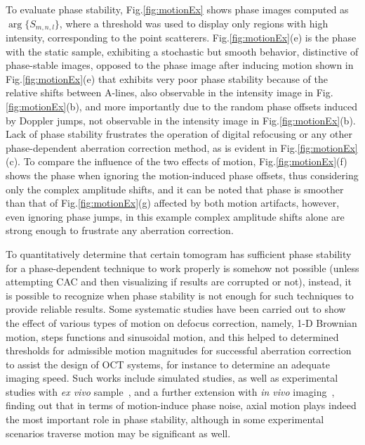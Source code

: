 To evaluate phase stability, Fig.\ref{fig:motionEx} shows phase images computed as $\arg\{S_{m,n,l}\}$, where a threshold was used to display only regions with high intensity, corresponding to the point scatterers. Fig.\ref{fig:motionEx}(e) is the phase with the static sample, exhibiting a stochastic but smooth behavior, distinctive of phase-stable images, opposed to the phase image after inducing motion shown in Fig.\ref{fig:motionEx}(e) that exhibits very poor phase stability because of the relative shifts between A-lines, also observable in the intensity image in Fig.\ref{fig:motionEx}(b), and more importantly due to the random phase offsets induced by Doppler jumps, not observable in the intensity image in Fig.\ref{fig:motionEx}(b). Lack of phase stability frustrates the operation of digital refocusing or any other phase-dependent aberration correction method, as is evident in Fig.\ref{fig:motionEx}(c). To compare the influence of the two effects of motion, Fig.\ref{fig:motionEx}(f) shows the phase when ignoring the motion-induced phase offsets, thus considering only the complex amplitude shifts, and it can be noted that phase is smoother than that of Fig.\ref{fig:motionEx}(g) affected by both motion artifacts, however, even ignoring phase jumps, in this example complex amplitude shifts alone are strong enough to frustrate any aberration correction.

To quantitatively determine that certain tomogram has sufficient phase stability for a phase-dependent technique to work properly is somehow not possible (unless attempting CAC and then visualizing if results are corrupted or not), instead, it is possible to recognize when phase stability is not enough for such techniques to provide reliable results. Some systematic studies have been carried out to show the effect of various types of motion on defocus correction, namely, 1-D Brownian motion, steps functions and sinusoidal motion, and this helped to determined thresholds for admissible motion magnitudes for successful aberration correction to assist the design of OCT systems, for instance to determine an adequate imaging speed. Such works include simulated studies, as well as experimental studies with \textit{ex vivo} sample~\cite{Shemonski2014_Stability}, and a further extension with \textit{in vivo} imaging~\cite{Shemonski2014_Stability-1}, finding out that in terms of motion-induce phase noise, axial motion plays indeed the most important role in phase stability, although in some experimental scenarios traverse motion may be significant as well.

